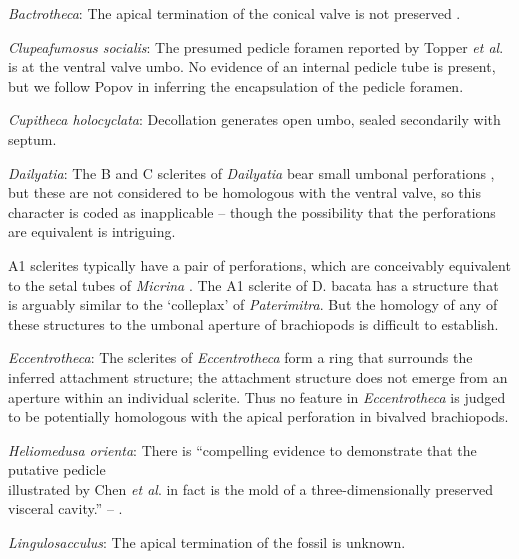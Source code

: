 \documentclass[openany]{book}
\begin{document}
\hypertarget{Bactrotheca-coding-119}{}
\emph{Bactrotheca}: The apical termination of the conical valve is not
preserved \citep{Valent2012}.

\hypertarget{Clupeafumosus_socialis-coding-119}{}
\emph{Clupeafumosus socialis}: The presumed pedicle foramen reported by
Topper \emph{et al}. \citeyearpar{Topper2013Reappraisalof} is at the
ventral valve umbo. No evidence of an internal pedicle tube is present,
but we follow Popov \citeyearpar{Popov1992TheCambrian} in inferring the
encapsulation of the pedicle foramen.

\hypertarget{Cupitheca_holocyclata-coding-119}{}
\emph{Cupitheca holocyclata}: Decollation generates open umbo, sealed
secondarily with septum.

\hypertarget{Dailyatia-coding-119}{}
\emph{Dailyatia}: The B and C sclerites of \emph{Dailyatia} bear small
umbonal perforations \citep{Skovsted2015Theearly}, but these are not
considered to be homologous with the ventral valve, so this character is
coded as inapplicable -- though the possibility that the perforations
are equivalent is intriguing.

A1 sclerites typically have a pair of perforations, which are
conceivably equivalent to the setal tubes of \emph{Micrina}
\citep{Holmer2011Firstrecord}. The A1 sclerite of D. bacata has a
structure that is arguably similar to the `colleplax' of
\emph{Paterimitra}. But the homology of any of these structures to the
umbonal aperture of brachiopods is difficult to establish.

\hypertarget{Eccentrotheca-coding-119}{}
\emph{Eccentrotheca}: The sclerites of \emph{Eccentrotheca} form a ring
that surrounds the inferred attachment structure; the attachment
structure does not emerge from an aperture within an individual
sclerite. Thus no feature in \emph{Eccentrotheca} is judged to be
potentially homologous with the apical perforation in bivalved
brachiopods.

\hypertarget{Heliomedusa_orienta-coding-119}{}
\emph{Heliomedusa orienta}: There is ``compelling evidence to
demonstrate that the putative pedicle\\
illustrated by Chen \emph{et al}. \citeyearpar[Figs. 4, 6,
7]{Chen2007Reinterpretationof} in fact is the mold of a
three-dimensionally preserved visceral cavity.'' --
\citet{Zhang2009Architectureand}.

\hypertarget{Lingulosacculus-coding-119}{}
\emph{Lingulosacculus}: The apical termination of the fossil is unknown.
\end{document}
